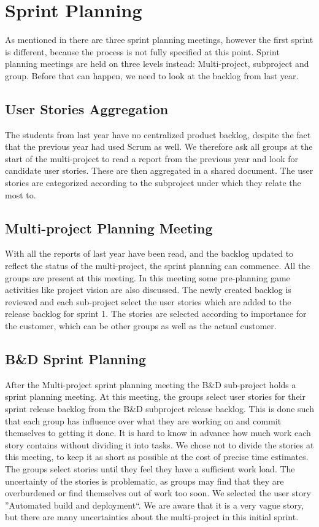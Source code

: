 \chapter{Sprint Planning}\label{chap:sprint1_planning}
As mentioned in  there are three sprint planning meetings, however the first sprint is different, because the process is not fully specified at this point. Sprint planning meetings are held on three levels instead: Multi-project, subproject and group. Before that can happen, we need to look at the backlog from last year.

\section{User Stories Aggregation}
The students from last year have no centralized product backlog, despite the fact that the previous year had used Scrum as well. We therefore ask all groups at the start of the multi-project to read a report from the previous year and look for candidate user stories. These are then aggregated in a shared document. The user stories are categorized according to the subproject under which they relate the most to.

\section{Multi-project Planning Meeting}

With all the reports of last year have been read, and the backlog updated to reflect the status of the multi-project, the sprint planning can commence. All the groups are present at this meeting. In this meeting some pre-planning game activities like project vision are also discussed. The newly created backlog is reviewed and each sub-project select the user stories which are added to the release backlog for sprint 1. The stories are selected according to importance for the customer, which can be other groups as well as the actual customer.

\section{B\&D Sprint Planning}

After the Multi-project sprint planning meeting the B\&D sub-project holds a sprint planning meeting. At this meeting, the groups select user stories for their sprint release backlog from the B\&D subproject release backlog. This is done such that each group has influence over what they are working on and commit themselves to getting it done. It is hard to know in advance how much work each story contains without dividing it into tasks. We chose not to divide the stories at this meeting, to keep it as short as possible at the cost of precise time estimates. The groups select stories until they feel they have a sufficient work load. The uncertainty of the stories is problematic, as groups may find that they are overburdened or find themselves out of work too soon. We selected the user story ''Automated build and deployment``. We are aware that it is a very vague story, but there are many uncertainties about the multi-project in this initial sprint.

